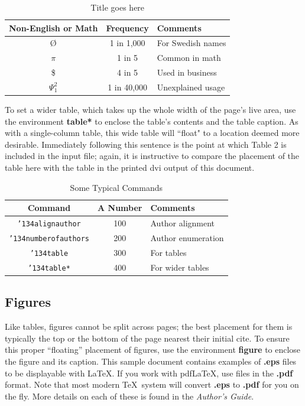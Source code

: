 \documentclass{sig-alternate-05-2015}
\begin{document}
\begin{table}
	\centering
	\caption{Title goes here}
	\begin{tabular}{|c|c|l|} 
		\hline
		Non-English or Math&Frequency&Comments\\ \hline
		\O & 1 in 1,000& For Swedish names\\ \hline
		$\pi$ & 1 in 5& Common in math\\ \hline
		\$ & 4 in 5 & Used in business\\ \hline
		$\Psi^2_1$ & 1 in 40,000& Unexplained usage\\
		\hline
	\end{tabular}
\end{table}

To set a wider table, which takes up the whole width of the page's live area, use the environment \textbf{table*} to enclose the table's contents and the table caption.  As with a single-column table, this wide table will ``float" to a location deemed more desirable. Immediately following this sentence is the point at which Table 2 is included in the input  file; again, it is instructive to compare the placement of the table here with the table in the printed dvi output of this document. 

\begin{table}
	\centering
	\caption{Some Typical Commands}
	\begin{tabular}{|c|c|l|} 
		\hline
		Command&A Number&Comments\\ \hline
		\texttt{{\char'134}alignauthor} & 100& Author alignment\\ \hline
		\texttt{{\char'134}numberofauthors}& 200& Author enumeration\\ \hline
		\texttt{{\char'134}table}& 300 & For tables\\ \hline
		\texttt{{\char'134}table*}& 400& For wider tables\\ 
		\hline
	\end{tabular}
\end{table}

\subsection{Figures}
Like tables, figures cannot be split across pages; the best placement for them is typically the top or the bottom of the page nearest their initial cite.  To ensure this proper ``floating'' placement of figures, use the environment \textbf{figure} to enclose the figure and its caption. This sample document contains examples of \textbf{.eps} files to be displayable with \LaTeX.  If you work with pdf\LaTeX, use files in the \textbf{.pdf} format.  Note that most modern \TeX\ system will convert \textbf{.eps} to \textbf{.pdf} for you on the fly.  More details on each of these is found in the \textit{Author's Guide}.
\end{document}
